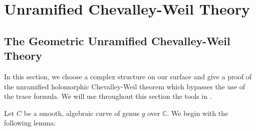 \documentclass[11pt]{amsart}
\numberwithin{thm}{section}
\begin{document}
\section{Unramified Chevalley-Weil Theory}\label{s:geometriccw}
\subsection{The Geometric Unramified Chevalley-Weil Theory}
In this section, we choose a complex structure on our surface and give a proof of the unramified holomorphic Chevalley-Weil theorem which bypasses the use of the trace formula.  We will use throughout this section the tools in \cite{ACGH}.

Let $C$ be a smooth, algebraic curve of genus $g$ over ${\mathbb{C}}$.  We begin with the following lemma:
\end{document}
